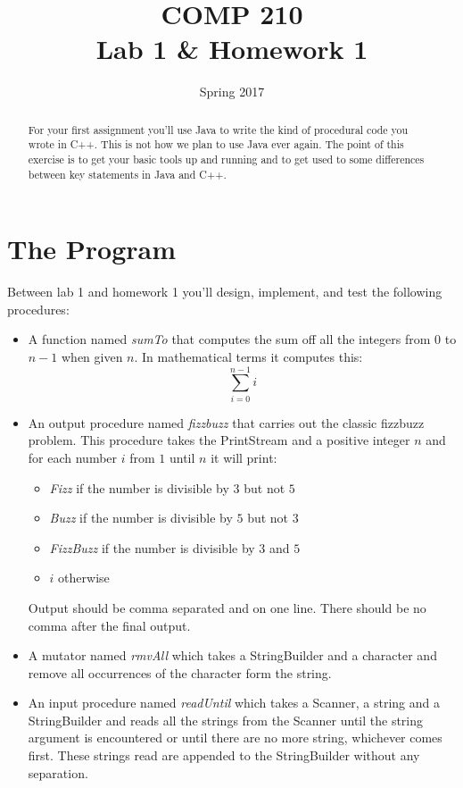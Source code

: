 \documentclass[nobib]{tufte-handout}
\title{COMP 210 \\ Lab 1 \& Homework 1}
\date{Spring 2017}
\begin{document}
\maketitle

\begin{abstract}
For your first assignment you'll use Java to write the kind of procedural code you wrote in C++. This is not how we plan to use Java ever again. The point of this exercise is to get your basic tools up and running and to get used to some differences between key statements in Java and C++.
\end{abstract}

\section{The Program}

Between lab 1 and homework 1 you'll design, implement, and test the following procedures:
\begin{itemize}
\item A function named \textit{sumTo} that computes the sum off all the integers from $0$ to $n-1$ when given $n$. In mathematical terms it computes this:
\[
\sum\limits_{i=0}^{n-1} i
\]

\item An output procedure named \textit{fizzbuzz} that carries out the classic fizzbuzz problem. This procedure takes the PrintStream and a positive integer $n$ and for each number $i$ from $1$ until $n$ it will print:
\begin{itemize}
\item \textit{Fizz} if the number is divisible by $3$ but not $5$
\item \textit{Buzz} if the number is divisible by $5$ but not $3$
\item \textit{FizzBuzz} if the number is divisible by $3$ and $5$
\item $i$ otherwise
\end{itemize}
Output should be comma separated and on one line. There should be no comma after the final output.

\item A mutator named \textit{rmvAll} which takes a StringBuilder and a character and remove all occurrences of the character form the string.

\item An input procedure named \textit{readUntil} which takes a Scanner, a string and a StringBuilder and reads all the strings from the Scanner until the string argument is encountered or until there are no more string, whichever comes first. These strings read are appended to the StringBuilder without any separation.
\end{itemize}
\end{document}
